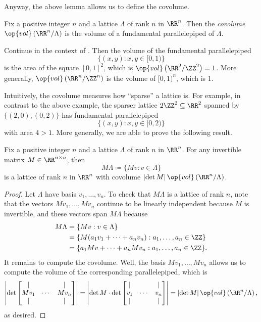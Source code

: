 \documentclass[../notes.tex]{subfiles}
\begin{document}
Anyway, the above lemma allows us to define the covolume.
\begin{definition}[covolume]
	Fix a positive integer $n$ and a lattice $\Lambda$ of rank $n$ in $\RR^n$. Then the \textit{covolume} $\op{vol}\left(\RR^n/\Lambda\right)$ is the volume of a fundamental parallelepiped of $\Lambda$.
\end{definition}
\begin{example}
	Continue in the context of . Then the volume of the fundamental parallelepiped
	\[\{(x,y):x,y\in[0,1)\}\]
	is the area of the square $[0,1]^2$, which is $\op{vol}\left(\RR^2/\ZZ^2\right)=1$. More generally, $\op{vol}\left(\RR^n/\ZZ^n\right)$ is the volume of $[0,1)^n$, which is $1$.
\end{example}
Intuitively, the covolume measures how ``sparse'' a lattice is. For example, in contrast to the above example, the sparser lattice $2\ZZ^2\subseteq\RR^2$ spanned by $\{(2,0),(0,2)\}$ has fundamental parallelepiped
\[\{(x,y):x,y\in[0,2)\}\]
with area $4>1$. More generally, we are able to prove the following result.
\begin{lemma} \label{lem:move-lattice-covol}
	Fix a positive integer $n$ and a lattice $\Lambda$ of rank $n$ in $\RR^n$. For any invertible matrix $M\in\RR^{n\times n}$, then
	\[M\Lambda\coloneqq\{Mv:v\in\Lambda\}\]
	is a lattice of rank $n$ in $\RR^n$ with covolume $\left|\det M\right|\op{vol}\left(\RR^n/\Lambda\right)$.
\end{lemma}
\begin{proof}
	Let $\Lambda$ have basis $v_1,\ldots,v_n$. To check that $M\Lambda$ is a lattice of rank $n$, note that the vectors $Mv_1,\ldots,Mv_n$ continue to be linearly independent because $M$ is invertible, and these vectors span $M\Lambda$ because
	\begin{align*}
		M\Lambda &= \{Mv:v\in\Lambda\} \\
		&= \{M(a_1v_1+\cdots+a_nv_n):a_1,\ldots,a_n\in\ZZ\} \\
		&= \{a_1Mv+\cdots+a_nMv_n:a_1,\ldots,a_n\in\ZZ\}.
	\end{align*}
	It remains to compute the covolume. Well, the basis $Mv_1,\ldots,Mv_n$ allows us to compute the volume of the corresponding parallelepiped, which is
	\[\left|\det\begin{bmatrix}
		| & & | \\
		Mv_1 & \cdots & Mv_n \\
		| & & |
	\end{bmatrix}\right|=\left|\det M\cdot\det\begin{bmatrix}
		| & & | \\
		v_1 & \cdots & v_n \\
		| & & |
	\end{bmatrix}\right|=\left|\det M\right|\op{vol}\left(\RR^n/\Lambda\right),\]
	as desired.
\end{proof}
\end{document}
